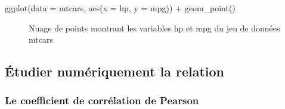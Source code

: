 \documentclass[
  letterpaper,
]{book}
\newenvironment{Shaded}{\begin{snugshade}}{\end{snugshade}}
\newcommand{\AttributeTok}[1]{\textcolor[rgb]{0.40,0.45,0.13}{#1}}
\newcommand{\FunctionTok}[1]{\textcolor[rgb]{0.28,0.35,0.67}{#1}}
\newcommand{\NormalTok}[1]{\textcolor[rgb]{0.00,0.23,0.31}{#1}}
\newcommand{\SpecialCharTok}[1]{\textcolor[rgb]{0.37,0.37,0.37}{#1}}
\begin{document}
\begin{Shaded}
\begin{Highlighting}[]
\FunctionTok{ggplot}\NormalTok{(}\AttributeTok{data =}\NormalTok{ mtcars, }\FunctionTok{aes}\NormalTok{(}\AttributeTok{x =}\NormalTok{ hp, }\AttributeTok{y =}\NormalTok{ mpg)) }\SpecialCharTok{+} 
  \FunctionTok{geom\_point}\NormalTok{()}
\end{Highlighting}
\end{Shaded}

\begin{figure}[H]


\caption{\label{fig-scatterplot}Nuage de points montrant les variables
hp et mpg du jeu de données mtcars}

\end{figure}%

\subsection{Étudier numériquement la
relation}\label{uxe9tudier-numuxe9riquement-la-relation}

\subsubsection{Le coefficient de corrélation de
Pearson}\label{le-coefficient-de-corruxe9lation-de-pearson}
\end{document}
